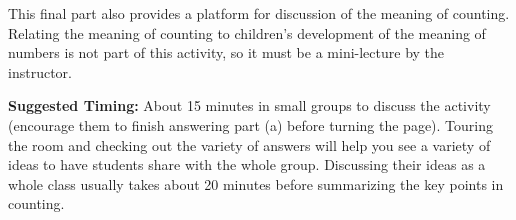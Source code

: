 \documentclass{ximera}
\begin{document}
\begin{instructorNotes}
This final part also provides a platform for discussion of the meaning of counting.  Relating the meaning of counting to children's development of the meaning of numbers is not part of this activity, so it must be a mini-lecture by the instructor.  


{\bf Suggested Timing:} About 15 minutes in small groups to discuss the activity (encourage them to finish answering part (a) before turning the page).  Touring the room and checking out the variety of answers will help you see a variety of ideas to have students share with the whole group.  Discussing their ideas as a whole class usually takes about 20 minutes before summarizing the key points in counting.  



\end{instructorNotes}
\end{document}
